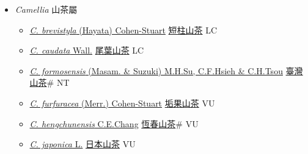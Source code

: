 
  \begin{itemize}
 \item[] \textit{Camellia} 山茶屬
                    
  \begin{itemize}
        \item[] \href{http://www.theplantlist.org/tpl1.1/search?q=Camellia+brevistyla}{\textit{C. brevistyla} (Hayata) Cohen-Stuart}   \href{\detokenize{http://taibnet.sinica.edu.tw/chi/taibnet_species_list.php?T2=短柱山茶&T2_new_value=true&fr=y}}{短柱山茶} LC
        \item[] \href{http://www.theplantlist.org/tpl1.1/search?q=Camellia+caudata}{\textit{C. caudata} Wall.}   \href{\detokenize{http://taibnet.sinica.edu.tw/chi/taibnet_species_list.php?T2=尾葉山茶&T2_new_value=true&fr=y}}{尾葉山茶} LC
        \item[] \href{http://www.theplantlist.org/tpl1.1/search?q=Camellia+formosensis}{\textit{C. formosensis} (Masam. \& Suzuki) M.H.Su, C.F.Hsieh \& C.H.Tsou}     \href{\detokenize{http://taibnet.sinica.edu.tw/chi/taibnet_species_list.php?T2=臺灣山茶&T2_new_value=true&fr=y}}{臺灣山茶}\# NT
        \item[] \href{http://www.theplantlist.org/tpl1.1/search?q=Camellia+furfuracea}{\textit{C. furfuracea} (Merr.) Cohen-Stuart}   \href{\detokenize{http://taibnet.sinica.edu.tw/chi/taibnet_species_list.php?T2=垢果山茶&T2_new_value=true&fr=y}}{垢果山茶} VU
        \item[] \href{http://www.theplantlist.org/tpl1.1/search?q=Camellia+hengchunensis}{\textit{C. hengchunensis} C.E.Chang}   \href{\detokenize{http://taibnet.sinica.edu.tw/chi/taibnet_species_list.php?T2=恆春山茶&T2_new_value=true&fr=y}}{恆春山茶}\# VU
        \item[] \href{http://www.theplantlist.org/tpl1.1/search?q=Camellia+japonica}{\textit{C. japonica} L.}   \href{\detokenize{http://taibnet.sinica.edu.tw/chi/taibnet_species_list.php?T2=日本山茶&T2_new_value=true&fr=y}}{日本山茶} VU

\end{itemize}
\end{itemize}
